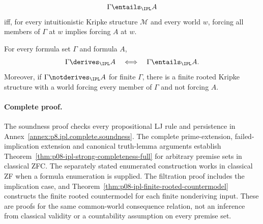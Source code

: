 
\begin{definition}
\[
  \Gamma\entails_{\IPL}A
\]
iff, for every intuitionistic Kripke structure \(\mathcal M\) and every
world \(w\), forcing all members of \(\Gamma\) at \(w\) implies forcing \(A\)
at \(w\).
\end{definition}

\begin{theorem}
For every formula set \(\Gamma\) and formula \(A\),
\[
  \Gamma\derives_{\IPL}A
  \quad\Longleftrightarrow\quad
  \Gamma\entails_{\IPL}A.
\]
Moreover, if \(\Gamma\notderives_{\IPL}A\) for finite \(\Gamma\), there is a
finite rooted Kripke structure with a world forcing every member of
\(\Gamma\) and not forcing \(A\).
\end{theorem}

\paragraph{Complete proof.}
The soundness proof checks every propositional LJ rule and persistence in
Annex~\ref{annex:p8.ipl.complete.soundness}. The complete prime-extension,
failed-implication extension and canonical truth-lemma arguments establish
Theorem~\ref{thm:p08-ipl-strong-completeness-full} for arbitrary premise sets
in classical ZFC. The separately stated enumerated construction works in
classical ZF when a formula enumeration is supplied. The filtration proof
includes the implication case, and
Theorem~\ref{thm:p08-ipl-finite-rooted-countermodel} constructs the finite
rooted countermodel for each finite nonderiving input. These are proofs for
the same common-world consequence relation, not an inference from classical
validity or a countability assumption on every premise set.

